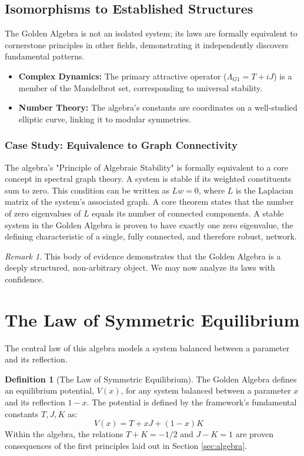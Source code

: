 \documentclass{article}
\theoremstyle{plain}
\theoremstyle{definition}
\newtheorem{definition}[theorem]{Definition}
\theoremstyle{remark}
\newtheorem*{remark}{Remark}
\begin{document}
\subsection{Isomorphisms to Established Structures}
The Golden Algebra is not an isolated system; its laws are formally equivalent to cornerstone principles in other fields, demonstrating it independently discovers fundamental patterns.
\begin{itemize}
    \item \textbf{Complex Dynamics:} The primary attractive operator ($\Lambda_{G1} = T+iJ$) is a member of the Mandelbrot set, corresponding to universal stability.
    \item \textbf{Number Theory:} The algebra's constants are coordinates on a well-studied elliptic curve, linking it to modular symmetries.
\end{itemize}

\subsubsection{Case Study: Equivalence to Graph Connectivity}
The algebra's "Principle of Algebraic Stability" is formally equivalent to a core concept in spectral graph theory. A system is stable if its weighted constituents sum to zero. This condition can be written as $Lw=0$, where $L$ is the Laplacian matrix of the system's associated graph. A core theorem states that the number of zero eigenvalues of $L$ equals its number of connected components. A stable system in the Golden Algebra is proven to have exactly one zero eigenvalue, the defining characteristic of a single, fully connected, and therefore robust, network.

\begin{remark}
This body of evidence demonstrates that the Golden Algebra is a deeply structured, non-arbitrary object. We may now analyze its laws with confidence.
\end{remark}

\section{The Law of Symmetric Equilibrium}
\label{sec:equilibrium}
The central law of this algebra models a system balanced between a parameter and its reflection.

\begin{definition}[The Law of Symmetric Equilibrium]
The Golden Algebra defines an equilibrium potential, $V(x)$, for any system balanced between a parameter $x$ and its reflection $1-x$. The potential is defined by the framework's fundamental constants $T, J, K$ as:
$$V(x) = T + xJ + (1-x)K \quad \text{}$$
Within the algebra, the relations $T+K = -1/2$ and $J-K=1$ are proven consequences of the first principles laid out in Section \ref{sec:algebra}.
\end{definition}
\end{document}
